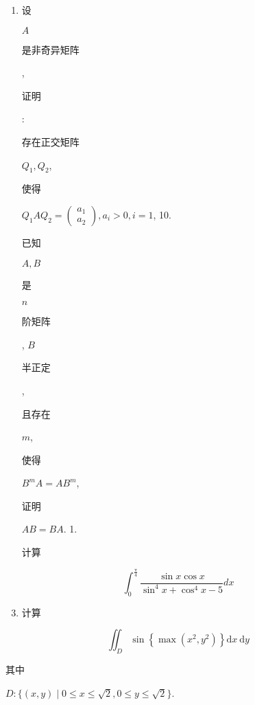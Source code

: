 \documentclass[10pt]{article}
\begin{document}
\begin{enumerate}
  \item \begin{CJK}{UTF8}{mj}设\end{CJK} $A$ \begin{CJK}{UTF8}{mj}是非奇异矩阵\end{CJK}, \begin{CJK}{UTF8}{mj}证明\end{CJK}: \begin{CJK}{UTF8}{mj}存在正交矩阵\end{CJK} $Q_{1}, Q_{2}$, \begin{CJK}{UTF8}{mj}使得\end{CJK} $Q_{1} A Q_{2}=\left(\begin{array}{c}a_{1} \\ a_{2}\end{array}\right), a_{i}>0, i=1$, 10. \begin{CJK}{UTF8}{mj}已知\end{CJK} $A, B$ \begin{CJK}{UTF8}{mj}是\end{CJK} $n$ \begin{CJK}{UTF8}{mj}阶矩阵\end{CJK}, $B$ \begin{CJK}{UTF8}{mj}半正定\end{CJK}, \begin{CJK}{UTF8}{mj}且存在\end{CJK} $m$, \begin{CJK}{UTF8}{mj}使得\end{CJK} $B^{m} A=A B^{m}$, \begin{CJK}{UTF8}{mj}证明\end{CJK} $A B=B A$. 1.\begin{CJK}{UTF8}{mj}计算\end{CJK}

\end{enumerate}
$$
\int_{0}^{\frac{\pi}{4}} \frac{\sin x \cos x}{\sin ^{4} x+\cos ^{4} x-5} d x
$$

\begin{enumerate}
  \setcounter{enumi}{2}
  \item \begin{CJK}{UTF8}{mj}计算\end{CJK}
\end{enumerate}
$$
\iint_{D} \sin \left\{\max \left(x^{2}, y^{2}\right)\right\} \mathrm{d} x \mathrm{~d} y
$$
\begin{CJK}{UTF8}{mj}其中\end{CJK} $D:\{(x, y) \mid 0 \leq x \leq \sqrt{2}, 0 \leq y \leq \sqrt{2}\}$.
\end{document}
